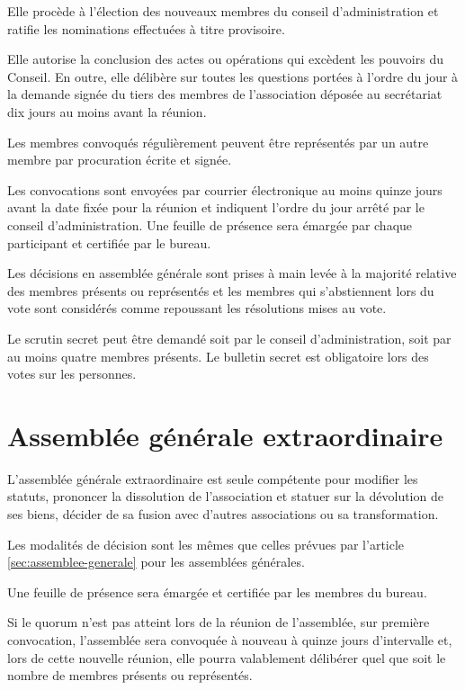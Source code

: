 \documentclass[12 pt]{article}
\begin{document}
Elle procède à l'élection des nouveaux membres du conseil
d'administration et ratifie les nominations effectuées à titre
provisoire.

Elle autorise la conclusion des actes ou opérations qui excèdent les
pouvoirs du Conseil. En outre, elle délibère sur toutes les questions
portées à l'ordre du jour à la demande signée du tiers des membres de
l'association déposée au secrétariat dix jours au moins avant la
réunion.

Les membres convoqués régulièrement peuvent être représentés par un
autre membre par procuration écrite et signée.

Les convocations sont envoyées par courrier électronique au moins
quinze jours avant la date fixée pour la réunion et indiquent l'ordre
du jour arrêté par le conseil d'administration. Une feuille de
présence sera émargée par chaque participant et certifiée par le
bureau.

Les décisions en assemblée générale sont prises à main levée à la
majorité relative des membres présents ou représentés et les
membres qui s'abstiennent lors du vote sont considérés comme
repoussant les résolutions mises au vote. %

Le scrutin secret peut être demandé soit par le conseil
d'administration, soit par au moins quatre membres présents. Le
bulletin secret est obligatoire lors des votes sur les personnes.

\section{Assemblée générale extraordinaire}
\label{sec:assemblee-generale-extraordinaire}

L'assemblée générale extraordinaire est seule compétente pour modifier
les statuts, prononcer la dissolution de l'association et statuer sur
la dévolution de ses biens, décider de sa fusion avec d'autres
associations ou sa transformation.

Les modalités de décision sont les mêmes que celles prévues par
l'article \ref{sec:assemblee-generale} pour les assemblées générales.

Une feuille de présence sera émargée et certifiée par les membres du bureau.

Si le quorum n'est pas atteint lors de la réunion de l'assemblée, sur
première convocation, l'assemblée sera convoquée à nouveau à quinze
jours d'intervalle et, lors de cette nouvelle réunion, elle pourra
valablement délibérer quel que soit le nombre de membres présents ou
représentés.
\end{document}
